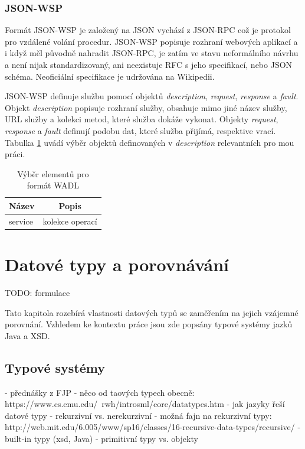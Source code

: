 \documentclass[czech,DP]{thesiskiv}
\begin{document}
\subsection{JSON-WSP}

Formát JSON-WSP je založený na JSON vychází z JSON-RPC což je protokol pro vzdálené volání procedur. JSON-WSP popisuje rozhraní webových aplikací a i když měl původně nahradit JSON-RPC, je zatím ve stavu neformálního návrhu a není nijak standardizovaný, ani neexistuje RFC s jeho specifikací, nebo JSON schéma. Neoficiální specifikace je udržována na Wikipedii\cite{jsonWspSpec}.


JSON-WSP definuje službu pomocí objektů \textit{description}, \textit{request}, \textit{response} a \textit{fault}. Objekt \textit{description} popisuje rozhraní služby, obsahuje mimo jiné název služby, URL služby a kolekci metod, které služba dokáže vykonat. Objekty \textit{request}, \textit{response} a \textit{fault} definují podobu dat, které služba přijímá, respektive vrací. Tabulka \ref{tab:jsonwsp-elements} uvádí výběr objektů definovaných v \textit{description} relevantních pro mou práci.

\begin{table}[h]
	\centering
	\begin{tabular}{|l|c|}
		\hline
		Název & Popis \\
		\hline
		\hline
		service & kolekce operací \\
		\hline
	\end{tabular}
	\caption{Výběr elementů pro formát WADL}
	\label{tab:jsonwsp-elements} 
\end{table}
 
 
\chapter{Datové typy a porovnávání}

TODO: formulace

Tato kapitola rozebírá vlastnosti datových typů se zaměřením na jejich vzájemné porovnání. Vzhledem ke kontextu práce jsou zde popsány typové systémy jazků Java a XSD.

\section{Typové systémy}

- přednášky z FJP
- něco od taových typech obecně: https://www.cs.cmu.edu/~rwh/introsml/core/datatypes.htm
- jak jazyky řeší datové typy
	- rekurzivní vs. nerekurzivní
	- možná fajn na rekurzivní typy: http://web.mit.edu/6.005/www/sp16/classes/16-recursive-data-types/recursive/
- built-in typy (xsd, Java)
- primitivní typy vs. objekty
\end{document}
